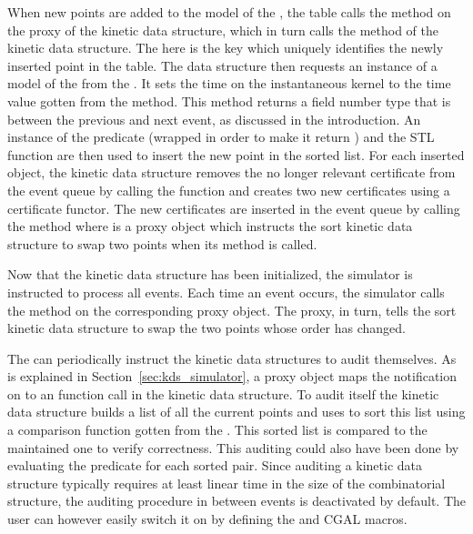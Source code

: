 When new points are added to the model of the
, the table calls the
 method on the proxy of the kinetic data
structure, which in turn calls the  method of
the kinetic data structure. The  here is the key which
uniquely identifies the newly inserted point in the table. The data
structure then requests an instance of a model of the
 from the
.  It sets the time on the
instantaneous kernel to the time value gotten from the
 method. This method
returns a field number type that is between the previous and next
event, as discussed in the introduction. An instance of the
 predicate (wrapped in order to make it return ) and the STL
function  are then used to insert the new
point in the sorted list. For each inserted object, the kinetic data
structure removes the no longer relevant certificate from the event
queue by calling the 
function and creates two new certificates using a
 certificate functor. The new
certificates are inserted in the event queue by calling the
 method where
 is a proxy object which instructs the sort
kinetic data structure to swap two points when its 
method is called.

Now that the kinetic data structure has been initialized, the
simulator is instructed to process all events. Each time an event
occurs, the simulator calls the  method on the
corresponding proxy object. The proxy, in turn, tells the sort kinetic
data structure to swap the two points whose order has changed.

The  can periodically instruct the kinetic data
structures to audit themselves.  As is explained in
Section~\ref{sec:kds_simulator}, a proxy object maps the notification on to an
 function call in the kinetic data structure. To audit
itself the kinetic data structure builds a list of all the current
points and uses  to sort this list using a
comparison function gotten from the .
This sorted list is compared to the maintained one to verify
correctness. This auditing could also have been done by evaluating the
 predicate for each sorted pair.  Since
auditing a kinetic data structure typically requires at least linear
time in the size of the combinatorial structure, the auditing
procedure in between events is deactivated by default.  The user can
however easily switch it on by defining the
 and  CGAL
macros.

